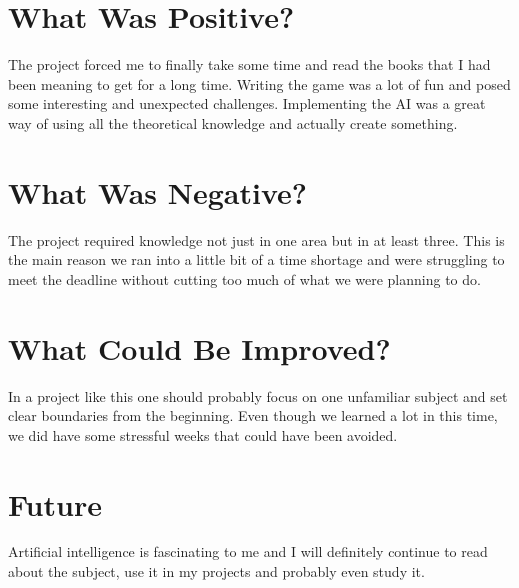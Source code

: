 \section*{What Was Positive?}
The project forced me to finally take some time and read the books that I had been meaning to get for a long time. Writing the game was a lot of fun and posed some interesting and unexpected challenges. Implementing the AI was a great way of using all the theoretical knowledge and actually create something.

\section*{What Was Negative?}
The project required knowledge not just in one area but in at least three. This is the main reason we ran into a little bit of a time shortage and were struggling to meet the deadline without cutting too much of what we were planning to do.

\section*{What Could Be Improved?}
In a project like this one should probably focus on one unfamiliar subject and set clear boundaries from the beginning. Even though we learned a lot in this time, we did have some stressful weeks that could have been avoided.

\section*{Future}
Artificial intelligence is fascinating to me and I will definitely continue to read about the subject, use it in my projects and probably even study it.



